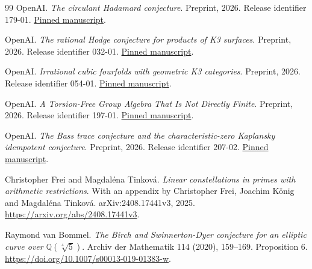 \begin{thebibliography}{99}
 OpenAI. \emph{The circulant Hadamard conjecture}. Preprint, 2026. Release identifier 179-01. \href{https://github.com/openai/math/blob/adc7f1241b42e322a6451854ab7e4b4c146bf78a/preprints/The-circulant-Hadamard-conjecture-September-23-2026/paper.pdf}{Pinned manuscript}.

 OpenAI. \emph{The rational Hodge conjecture for products of K3 surfaces}. Preprint, 2026. Release identifier 032-01. \href{https://github.com/openai/math/blob/adc7f1241b42e322a6451854ab7e4b4c146bf78a/preprints/The-rational-Hodge-conjecture-for-products-of-K3-surfaces-October-4-2026/hodge-conjecture-products-k3.pdf}{Pinned manuscript}.

 OpenAI. \emph{Irrational cubic fourfolds with geometric K3 categories}. Preprint, 2026. Release identifier 054-01. \href{https://github.com/openai/math/blob/adc7f1241b42e322a6451854ab7e4b4c146bf78a/preprints/Irrational-cubic-fourfolds-with-geometric-K3-categories-September-24-2026/Irrational-cubic-fourfolds-with-geometric-K3-categories-September-24-2026.pdf}{Pinned manuscript}.

 OpenAI. \emph{A Torsion-Free Group Algebra That Is Not Directly Finite}. Preprint, 2026. Release identifier 197-01. \href{https://github.com/openai/math/blob/adc7f1241b42e322a6451854ab7e4b4c146bf78a/preprints/A-Torsion-Free-Group-Algebra-That-Is-Not-Directly-Finite-October-4-2026/direct-finiteness.pdf}{Pinned manuscript}.

 OpenAI. \emph{The Bass trace conjecture and the characteristic-zero Kaplansky idempotent conjecture}. Preprint, 2026. Release identifier 207-02. \href{https://github.com/openai/math/blob/adc7f1241b42e322a6451854ab7e4b4c146bf78a/preprints/The-Bass-trace-conjecture-for-complex-group-rings-September-24-2026/The-Bass-trace-conjecture-for-complex-group-rings-September-24-2026.pdf}{Pinned manuscript}.

 Christopher Frei and Magdal\'ena Tinkov\'a. \emph{Linear constellations in primes with arithmetic restrictions}. With an appendix by Christopher Frei, Joachim K\"onig and Magdal\'ena Tinkov\'a. arXiv:2408.17441v3, 2025. \url{https://arxiv.org/abs/2408.17441v3}.

 Raymond van Bommel. \emph{The Birch and Swinnerton-Dyer conjecture for an elliptic curve over $\mathbb Q(\sqrt[4]{5})$}. Archiv der Mathematik 114 (2020), 159--169. Proposition 6. \url{https://doi.org/10.1007/s00013-019-01383-w}.


\end{thebibliography}
